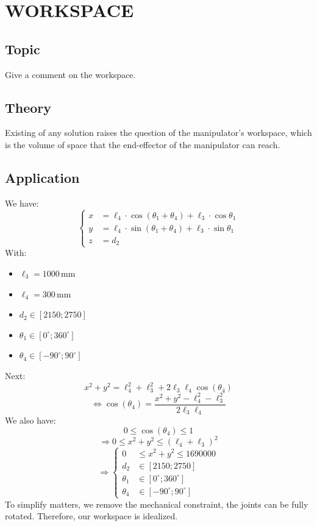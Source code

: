 \chapter{WORKSPACE}
\section{Topic}
Give a comment on the workspace.
\section{Theory}
Existing of any solution raises the question of the manipulator's workspace, which is the volume of space that the end-effector of the manipulator can reach.
\section{Application}
We have: 
\[
\left\{
\begin{aligned}
x &= \ell_4 \cdot \cos(\theta_1 + \theta_4) + \ell_3 \cdot \cos\theta_1 \\
y &= \ell_4 \cdot \sin(\theta_1 + \theta_4) + \ell_3 \cdot \sin\theta_1 \\
z &= d_2
\end{aligned}
\right.
\]
With:
\begin{itemize}
    \item $\ell_3 = 1000\,\text{mm}$
    \item $\ell_4 = 300\,\text{mm}$
    \item $d_2 \in [2150; 2750]$
    \item $\theta_1 \in [0^\circ; 360^\circ]$
    \item $\theta_4 \in [-90^\circ; 90^\circ]$
\end{itemize}
Next:
\[
    x^2 + y^2 = \ell_4^2 + \ell_3^2 + 2\ell_3 \ell_4 \cos(\theta_4)
\]
\[
    \Leftrightarrow \cos(\theta_4) = \frac{x^2 + y^2 - \ell_4^2 - \ell_3^2}{2 \ell_3 \ell_4}
\]
We also have:
\[
    0 \leq \cos(\theta_4) \leq 1
\]
\[
    \Rightarrow 0 \leq x^2 + y^2 \leq (\ell_4 + \ell_3)^2
\]
\[
\Rightarrow 
\left\{
\begin{aligned}
0 &\leq x^2 + y^2 \leq 1690000 \\
d_2 &\in [2150; 2750] \\
\theta_1 &\in [0^\circ; 360^\circ] \\
\theta_4 &\in [-90^\circ; 90^\circ]
\end{aligned}
\right.
\]
To simplify matters, we remove the mechanical constraint, the joints can be fully rotated. Therefore, our workspace is idealized.
